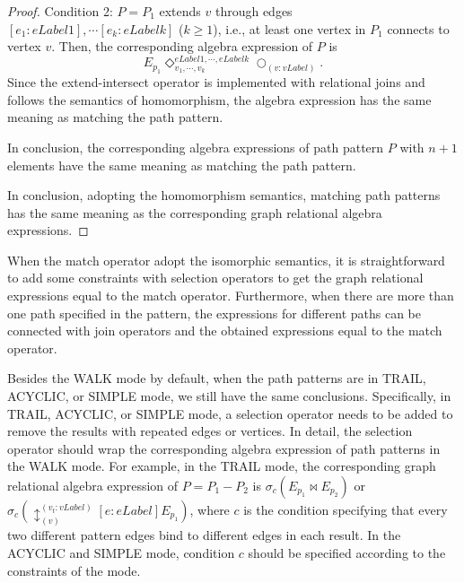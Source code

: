 \begin{proof}
    Condition 2: $P = P_1$ extends $v$ through edges $[e_1:eLabel1], \cdots [e_k:eLabelk]$ ($k \geq 1$), i.e., at least one vertex in $P_1$ connects to vertex $v$.
    Then, the corresponding algebra expression of $P$ is
    \begin{equation*}
        E_{p_1} \Diamond_{v_1, \cdots, v_k}^{eLabel1, \cdots, eLabelk} \bigcirc_{(v:vLabel)}.
    \end{equation*}
    Since the extend-intersect operator is implemented with relational joins and follows the semantics of homomorphism, the algebra expression has the same meaning as matching the path pattern.

    In conclusion, the corresponding algebra expressions of path pattern $P$ with $n + 1$ elements have the same meaning as matching the path pattern.

    In conclusion, adopting the homomorphism semantics, matching path patterns has the same meaning as the corresponding graph relational algebra expressions.
\end{proof}

When the match operator adopt the isomorphic semantics, it is straightforward to add some constraints with selection operators to get the graph relational expressions equal to the match operator.
Furthermore, when there are more than one path specified in the pattern, the expressions for different paths can be connected with join operators and the obtained expressions equal to the match operator.


Besides the WALK mode by default, when the path patterns are in TRAIL, ACYCLIC, or SIMPLE mode, we still have the same conclusions.
Specifically, in TRAIL, ACYCLIC, or SIMPLE mode, a selection operator needs to be added to remove the results with repeated edges or vertices.
In detail, the selection operator should wrap the corresponding algebra expression of path patterns in the WALK mode.
For example, in the TRAIL mode, the corresponding graph relational algebra expression of $P = P_1 - P_2$ is $\sigma_{c}(E_{p_1} \Join E_{p_2})$ or $\sigma_{c}(\updownarrow_{(v)}^{(v_t:vLabel)}[e:eLabel]E_{p_1})$, where $c$ is the condition specifying that every two different pattern edges bind to different edges in each result.
In the ACYCLIC and SIMPLE mode, condition $c$ should be specified according to the constraints of the mode.

